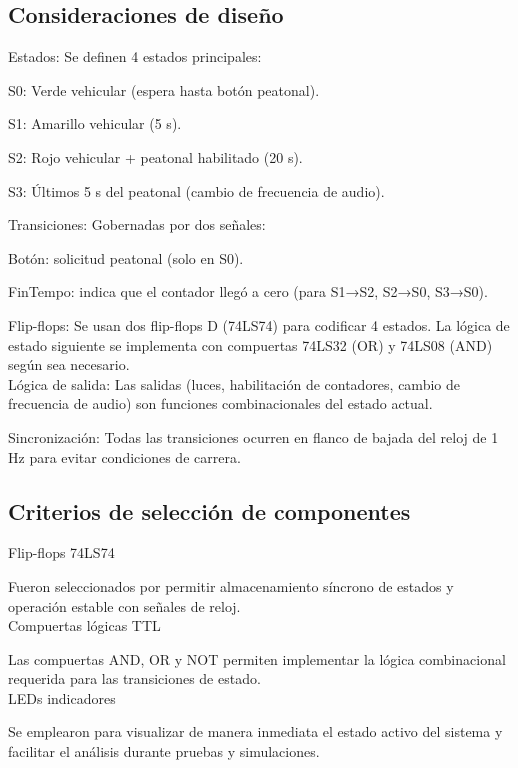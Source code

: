 \documentclass[journal]{IEEEtran}
\begin{document}
\subsection{Consideraciones de diseño}

Estados: Se definen 4 estados principales:

S0: Verde vehicular (espera hasta botón peatonal).

S1: Amarillo vehicular (5 s).

S2: Rojo vehicular + peatonal habilitado (20 s).

S3: Últimos 5 s del peatonal (cambio de frecuencia de audio).

Transiciones: Gobernadas por dos señales:

Botón: solicitud peatonal (solo en S0).

FinTempo: indica que el contador llegó a cero (para S1→S2, S2→S0, S3→S0).

Flip-flops: Se usan dos flip-flops D (74LS74) para codificar 4 estados. La lógica de estado siguiente se implementa con compuertas 74LS32 (OR) y 74LS08 (AND) según sea necesario. \\

Lógica de salida: Las salidas (luces, habilitación de contadores, cambio de frecuencia de audio) son funciones combinacionales del estado actual.

Sincronización: Todas las transiciones ocurren en flanco de bajada del reloj de 1 Hz para evitar condiciones de carrera.

\subsection{Criterios de selección de componentes}

Flip-flops 74LS74

Fueron seleccionados por permitir almacenamiento síncrono de estados y operación estable con señales de reloj.\\

Compuertas lógicas TTL

Las compuertas AND, OR y NOT permiten implementar la lógica combinacional requerida para las transiciones de estado.\\

LEDs indicadores

Se emplearon para visualizar de manera inmediata el estado activo del sistema y facilitar el análisis durante pruebas y simulaciones.\\
\end{document}
